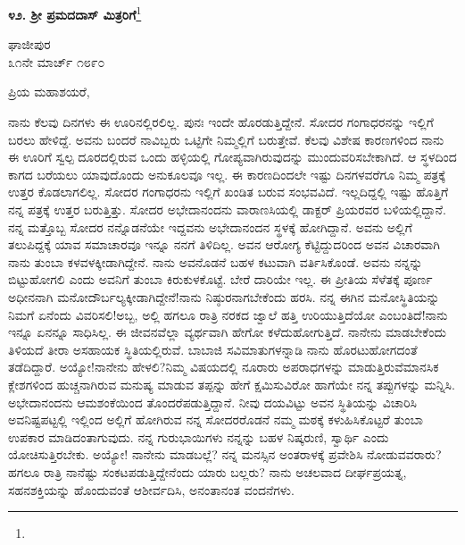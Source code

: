 \begin{center}
\textbf{೪೨. ಶ‍್ರೀ ಪ್ರಮದದಾಸ್ ಮಿತ್ರರಿಗೆ}\footnote{}
\end{center}

\vspace{-0.5cm}

\begin{flushright}
ಘಾಜೀಪುರ\\೩೧ನೇ ಮಾರ್ಚ್ ೧೮೯೦
\end{flushright}
\vspace{-0.3cm}

\noindent
ಪ್ರಿಯ ಮಹಾಶಯರೆ,

ನಾನು ಕೆಲವು ದಿನಗಳು ಈ ಊರಿನಲ್ಲಿರಲಿಲ್ಲ. ಪುನಃ ಇಂದೇ ಹೊರಡುತ್ತಿದ್ದೇನೆ. ಸೋದರ ಗಂಗಾಧರನನ್ನು ಇಲ್ಲಿಗೆ ಬರಲು ಹೇಳಿದ್ದೆ. ಅವನು ಬಂದರೆ ನಾವಿಬ್ಬರು ಒಟ್ಟಿಗೇ ನಿಮ್ಮಲ್ಲಿಗೆ ಬರುತ್ತೇವೆ. ಕೆಲವು ವಿಶೇಷ ಕಾರಣಗಳಿಂದ ನಾನು ಈ ಊರಿಗೆ ಸ್ವಲ್ಪ ದೂರದಲ್ಲಿರುವ ಒಂದು ಹಳ್ಳಿಯಲ್ಲಿ ಗೋಪ್ಯವಾಗಿರುವುದನ್ನು ಮುಂದುವರಿಸಬೇಕಾಗಿದೆ. ಆ ಸ್ಥಳದಿಂದ ಕಾಗದ ಬರೆಯಲು ಯಾವುದೊಂದು ಅನುಕೂಲವೂ ಇಲ್ಲ. ಈ ಕಾರಣದಿಂದಲೇ ಇಷ್ಟು ದಿನಗಳವರೆಗೂ ನಿಮ್ಮ ಪತ್ರಕ್ಕೆ ಉತ್ತರ ಕೊಡಲಾಗಲಿಲ್ಲ. ಸೋದರ ಗಂಗಾಧರನು ಇಲ್ಲಿಗೆ ಖಂಡಿತ ಬರುವ ಸಂಭವವಿದೆ. ಇಲ್ಲದಿದ್ದಲ್ಲಿ ಇಷ್ಟು ಹೊತ್ತಿಗೆ ನನ್ನ ಪತ್ರಕ್ಕೆ ಉತ್ತರ ಬರುತ್ತಿತ್ತು. ಸೋದರ ಅಭೇದಾನಂದನು ವಾರಾಣಸಿಯಲ್ಲಿ ಡಾಕ್ಟರ್ ಪ್ರಿಯರವರ ಬಳಿಯಲ್ಲಿದ್ದಾನೆ. ನನ್ನ ಮತ್ತೊಬ್ಬ ಸೋದರ ನನ್ನೊಡನೆಯೇ ಇದ್ದವನು ಅಭೇದಾನಂದನ ಸ್ಥಳಕ್ಕೆ ಹೋಗಿದ್ದಾನೆ. ಅವನು ಅಲ್ಲಿಗೆ ತಲುಪಿದ್ದಕ್ಕೆ ಯಾವ ಸಮಾಚಾರವೂ ಇನ್ನೂ ನನಗೆ ತಿಳಿದಿಲ್ಲ. ಅವನ ಆರೋಗ್ಯ ಕೆಟ್ಟಿದ್ದುದರಿಂದ ಅವನ ವಿಚಾರವಾಗಿ ನಾನು ತುಂಬಾ ಕಳವಳಕ್ಕೀಡಾಗಿದ್ದೇನೆ. ನಾನು ಅವನೊಡನೆ ಬಹಳ ಕಟುವಾಗಿ ವರ್ತಿಸಿಕೊಂಡೆ. ಅವನು ನನ್ನನ್ನು ಬಿಟ್ಟುಹೋಗಲಿ ಎಂದು ಅವನಿಗೆ ತುಂಬಾ ಕಿರುಕುಳಕೊಟ್ಟೆ. ಬೇರೆ ದಾರಿಯೇ ಇಲ್ಲ. ಈ ಪ್ರೀತಿಯ ಸೆಳೆತಕ್ಕೆ ಪೂರ್ಣ ಅಧೀನನಾಗಿ ಮನೋದೌರ್ಬಲ್ಯಕ್ಕೀಡಾಗಿದ್ದೇನೆ!ನಾನು ನಿಷ್ಠುರನಾಗಬೇಕೆಂದು ಹರಸಿ. ನನ್ನ ಈಗಿನ ಮನೋಸ್ಥಿತಿಯನ್ನು ನಿಮಗೆ ಏನೆಂದು ವಿವರಿಸಲಿ!ಅಬ್ಬ, ಅಲ್ಲಿ ಹಗಲೂ ರಾತ್ರಿ ನರಕದ ಜ್ವಾಲೆ ಹತ್ತಿ ಉರಿಯುತ್ತಿದೆಯೋ ಎಂಬಂತಿದೆ!ನಾನು ಇನ್ನೂ ಏನನ್ನೂ ಸಾಧಿಸಿಲ್ಲ. ಈ ಜೀವನವೆಲ್ಲಾ ವ್ಯರ್ಥವಾಗಿ ಹೇಗೋ ಕಳೆದುಹೋಗುತ್ತಿದೆ. ನಾನೇನು ಮಾಡಬೇಕೆಂದು ತಿಳಿಯದೆ ತೀರಾ ಅಸಹಾಯಕ ಸ್ಥಿತಿಯಲ್ಲಿರುವೆ. ಬಾಬಾಜಿ ಸವಿಮಾತುಗಳನ್ನಾಡಿ ನಾನು ಹೊರಟುಹೋಗದಂತೆ ತಡೆದಿದ್ದಾರೆ. ಅಯ್ಯೋ!ನಾನೇನು ಹೇಳಲಿ?ನಿಮ್ಮ ವಿಷಯದಲ್ಲಿ ನೂರಾರು ಅಪರಾಧಗಳನ್ನು ಮಾಡುತ್ತಿರುವೆ\enginline{-}ಮಾನಸಿಕ ಕ್ಲೇಶಗಳಿಂದ ಹುಚ್ಚನಾಗಿರುವ ಮನುಷ್ಯ ಮಾಡುವ ತಪ್ಪನ್ನು ಹೇಗೆ ಕ್ಷಮಿಸುವಿರೋ ಹಾಗೆಯೇ ನನ್ನ ತಪ್ಪುಗಳನ್ನು ಮನ್ನಿಸಿ. ಅಭೇದಾನಂದನು ಆಮಶಂಕೆಯಿಂದ ತೊಂದರೆಪಡುತ್ತಿದ್ದಾನೆ. ನೀವು ದಯವಿಟ್ಟು ಅವನ ಸ್ಥಿತಿಯನ್ನು ವಿಚಾರಿಸಿ ಅವನಿಷ್ಟಪಟ್ಟಲ್ಲಿ ಇಲ್ಲಿಂದ ಅಲ್ಲಿಗೆ ಹೋಗಿರುವ ನನ್ನ ಸೋದರರೊಡನೆ ನಮ್ಮ ಮಠಕ್ಕೆ ಕಳುಹಿಸಿಕೊಟ್ಟರೆ ತುಂಬಾ ಉಪಕಾರ ಮಾಡಿದಂತಾಗುವುದು. ನನ್ನ ಗುರುಭಾಯಿಗಳು ನನ್ನನ್ನು ಬಹಳ ನಿಷ್ಕರುಣಿ, ಸ್ವಾರ್ಥಿ ಎಂದು ಯೋಚಿಸುತ್ತಿರಬೇಕು. ಅಯ್ಯೋ! ನಾನೇನು ಮಾಡಬಲ್ಲೆ? ನನ್ನ ಮನಸ್ಸಿನ ಅಂತರಾಳಕ್ಕೆ ಪ್ರವೇಶಿಸಿ ನೋಡುವವರಾರು? ಹಗಲೂ ರಾತ್ರಿ ನಾನೆಷ್ಟು ಸಂಕಟಪಡುತ್ತಿದ್ದೇನೆಂದು ಯಾರು ಬಲ್ಲರು? ನಾನು ಅಚಲವಾದ ದೀರ್ಘಪ್ರಯತ್ನ, ಸಹನಶಕ್ತಿಯನ್ನು ಹೊಂದುವಂತೆ ಆಶೀರ್ವದಿಸಿ, ಅನಂತಾನಂತ ವಂದನೆಗಳು.


